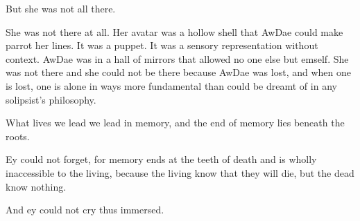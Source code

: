 But she was not all there.

She was not there at all. Her avatar was a hollow shell that AwDae could make parrot her lines. It was a puppet. It was a sensory representation without context. AwDae was in a hall of mirrors that allowed no one else but emself. She was not there and she could not be there because AwDae was lost, and when one is lost, one is alone in ways more fundamental than could be dreamt of in any solipsist's philosophy.

What lives we lead we lead in memory, and the end of memory lies beneath the roots.

Ey could not forget, for memory ends at the teeth of death and is wholly inaccessible to the living, because the living know that they will die, but the dead know nothing.

And ey could not cry thus immersed.
